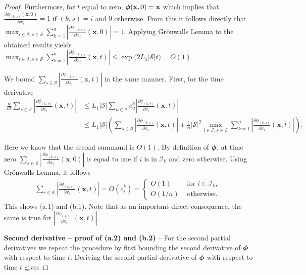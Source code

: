 \documentclass[acmsmall]{acmart}
\newcommand\bx{\mathbf{x}}
\newcommand\bphi{\text{\boldmath$\phi$}}
\newcommand\calI{\mathcal{I}}
\newcommand\calS{\mathcal{S}}
\newcommand\abs[1]{\left|#1\right|}         %
\begin{document}
\begin{proof}
Furthermore, for $t$ equal to zero, $\bphi(\bx, 0)=\bx$ which implies that $\frac{\partial \phi_{(k,s)}(\bx, 0)}{\partial x_{i}}=1$ if $(k,s)=i$ and $0$ otherwise. From this it follows directly that $\max_{i\in\calI, s\in S} \sum_{k=1}^{n} \abs{\frac{\partial \phi_{(k,s)}}{\partial x_{i}}(\bx,0)} = 1$. Applying Grönwalls Lemma to the obtained results yields $ \max_{i\in\calI, s\in \calS} \sum_{k=1}^{n} \abs{\frac{\partial \phi_{(k,s)}}{\partial x_{i}}(\bx,t)} \leq \exp\bigl( 2L_{1} \abs{\calS} t \bigr) = O(1)$.

We bound $\sum_{s\in \calS} \abs{\frac{\partial \phi_{(k,s)}}{\partial x_i}(\bx,t)}$ in the same manner. First, for the time derivative
\begin{align*}
\frac{d}{dt}\sum_{s\in\calS} \abs{\frac{\partial \phi_{(k,s)}}{\partial x_i}(\bx,t)} &\leq L_{1} \abs{\calS} \sum_{u\in \calI} c^k_{u} \abs{\frac{\partial \phi_{(k,s)}}{\partial x_i}(\bx,t)} \\
& \leq L_{1} \abs{\calS} \left( \sum_{s\in\calS} \abs{\frac{\partial \phi_{(k,s)}}{\partial x_i}(\bx,t)} + \frac{1}{n}\abs{\calS}^2 \max_{i\in\calI, s\in \calS} \sum_{k=1}^{n} \abs{\frac{\partial \phi_{(k,s)}}{\partial x_{i}}(\bx,t)} \right).
\end{align*}



Here we know that the second summand is $O(1)$. By definition of $\bphi$, at time zero  $\sum_{s\in\calS} \abs{\frac{\partial \phi_{(k,s)}}{\partial x_i}(\bx,0)}$ is equal to one if $i$ is in $\calI_k$ and zero otherwise. Using Grönwalls Lemma, it follows
\begin{align*}
  \sum_{s\in\calS} \abs{\frac{\partial \phi_{(k,s)}}{\partial x_i}(\bx,t)} = O(c^k_i) = 
  \begin{cases}
    O(1)  & \text{ for } i \in \calI_k, \\ 
    O(1/n)  & \text{ otherwise. }
  \end{cases}
\end{align*}
This shows (a.1) and (b.1). Note that as an important direct consequence, the same is true for $\abs{\frac{\partial \phi_{(k,s)}}{\partial x_i}(\bx,t)}$.
\medskip

\textbf{Second derivative -- proof of (a.2) and (b.2)} -- For the second partial derivatives we repeat the procedure by first bounding the second derivative of $\bphi$ with respect to time $t$. Deriving the second partial derivative of $\bphi$ with respect to time $t$ gives


\end{proof}
\end{document}
